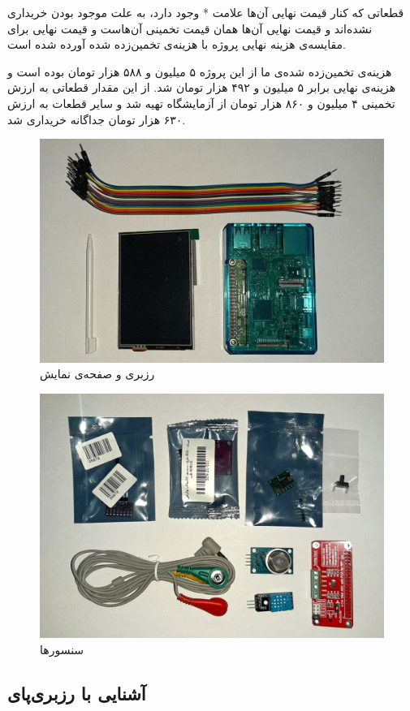 \documentclass[12pt]{article}
\begin{document}
قطعاتی که کنار قیمت نهایی آن‌ها علامت * وجود دارد، به علت موجود بودن خریداری نشده‌اند و قیمت نهایی آن‌ها همان قیمت تخمینی آن‌هاست و قیمت نهایی برای مقایسه‌ی هزینه نهایی پروژه با هزینه‌ی تخمین‌زده شده آورده شده‌ است.


هزینه‌ی تخمین‌زده شده‌ی ما از این پروژه ۵ میلیون و ۵۸۸ هزار تومان بوده است و هزینه‌ی نهایی برابر ۵ میلیون و ۴۹۲ هزار تومان شد. از این مقدار قطعاتی به ارزش تخمینی ۴ میلیون و ۸۶۰ هزار تومان از آزمایشگاه تهیه شد و سایر قطعات به ارزش ۶۳۰ هزار تومان جداگانه خریداری شد.


\begin{figure}[h]
	\begin{center}
		\includegraphics[width=.63\textwidth]{pic1} %
	\end{center}
	\caption{رزبری و صفحه‌ی نمایش}
\end{figure}

\begin{figure}[h]
	\begin{center}
		\includegraphics[width=.63\textwidth,trim={0 0.5cm 0 1cm},clip]{pic2} %
	\end{center}
	\caption{سنسورها}
\end{figure}


\subsection{آشنایی با رزبری‌پای}
\end{document}

